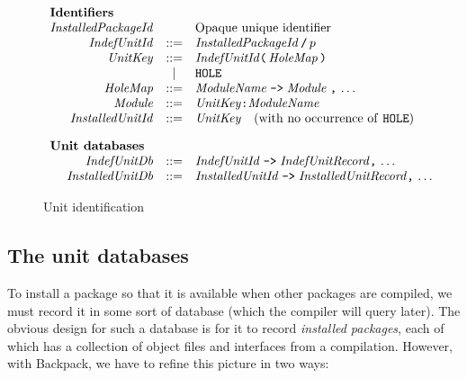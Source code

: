 \documentclass{article}
\newcommand{\I}[1]{\ensuremath{\mathit{#1}}}
\begin{document}
\begin{figure}[htpb]
$$
\begin{array}{rcll}
\multicolumn{3}{l}{\mbox{\bf Identifiers}} \\
  \I{InstalledPackageId} &  & \mbox{Opaque unique identifier} \\
  \I{IndefUnitId} & ::= & \I{InstalledPackageId}\, \verb|/|\, p  \\
  \I{UnitKey} & ::= & \I{IndefUnitId} \verb|(|\, \I{HoleMap}\, \verb|)|  \\
              & | & \verb|HOLE| \\
  \I{HoleMap} & ::= & \I{ModuleName}\; \verb|->|\; \I{Module}\; \verb|,|\, \ldots \\
  \I{Module} & ::= & \I{UnitKey} \verb|:| \I{ModuleName}  \\
  \I{InstalledUnitId} & ::= & \I{UnitKey} \quad \mbox{(with no occurrence of \texttt{HOLE})} \\[1em]
\multicolumn{3}{l}{\mbox{\bf Unit databases}} \\
  \I{IndefUnitDb} & ::= & \I{IndefUnitId} \; \verb|->| \; \I{IndefUnitRecord} \verb|,|\, \ldots \\
  \I{InstalledUnitDb} & ::= & \I{InstalledUnitId} \; \verb|->| \; \I{InstalledUnitRecord} \verb|,|\, \ldots \\
\end{array}
$$
\caption{Unit identification} \label{fig:ids}
\end{figure}

\subsection{The unit databases}

To install a package so that it is available when other packages are compiled,
we must record it in some sort of database (which the compiler will query later).
The obvious design for such a database is for it to record \emph{installed packages},
each of which has a collection of object files and interfaces from a compilation.
However, with Backpack, we have to refine this picture in two ways:
\end{document}
